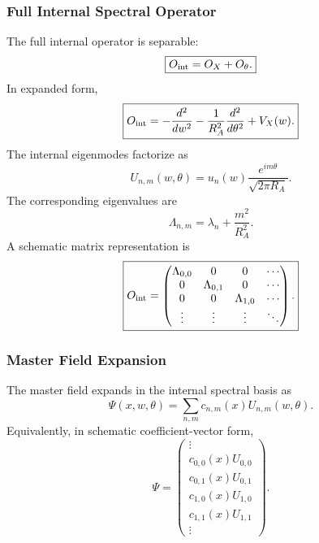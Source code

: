 \documentclass[11pt]{article}
\begin{document}
\subsubsection{Full Internal Spectral Operator}
\label{app:internal-spectral-operator}

The full internal operator is separable:
\begin{equation}
\boxed{
O_{\rm int}
=
O_X+O_\theta.
}
\end{equation}
In expanded form,
\begin{equation}
\boxed{
O_{\rm int}
=
-\frac{d^2}{dw^2}
-
\frac{1}{R_A^2}
\frac{d^2}{d\theta^2}
+
V_X(w).
}
\end{equation}
The internal eigenmodes factorize as
\begin{equation}
\boxed{
U_{n,m}(w,\theta)
=
u_n(w)
\frac{e^{im\theta}}{\sqrt{2\pi R_A}}.
}
\end{equation}
The corresponding eigenvalues are
\begin{equation}
\boxed{
\Lambda_{n,m}
=
\lambda_n
+
\frac{m^2}{R_A^2}.
}
\end{equation}
A schematic matrix representation is
\begin{equation}
\boxed{
O_{\rm int}
=
\begin{pmatrix}
\Lambda_{0,0} & 0 & 0 & \cdots \\
0 & \Lambda_{0,1} & 0 & \cdots \\
0 & 0 & \Lambda_{1,0} & \cdots \\
\vdots & \vdots & \vdots & \ddots
\end{pmatrix}.
}
\end{equation}

\subsubsection{Master Field Expansion}
\label{app:master-field-expansion}

The master field expands in the internal spectral basis as
\begin{equation}
\boxed{
\Psi(x,w,\theta)
=
\sum_{n,m}
c_{n,m}(x)
U_{n,m}(w,\theta).
}
\end{equation}
Equivalently, in schematic coefficient-vector form,
\begin{equation}
\boxed{
\Psi
=
\begin{pmatrix}
\vdots \\
c_{0,0}(x)U_{0,0} \\
c_{0,1}(x)U_{0,1} \\
c_{1,0}(x)U_{1,0} \\
c_{1,1}(x)U_{1,1} \\
\vdots
\end{pmatrix}.
}
\end{equation}
\end{document}
